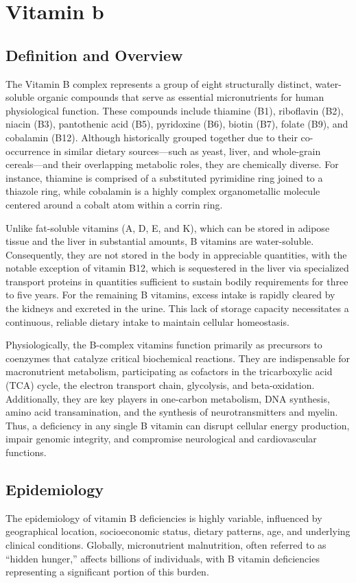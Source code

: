 \chapter{Vitamin b}

\section*{Definition and Overview}
The Vitamin B complex represents a group of eight structurally distinct, water-soluble organic compounds that serve as essential micronutrients for human physiological function. These compounds include thiamine (B1), riboflavin (B2), niacin (B3), pantothenic acid (B5), pyridoxine (B6), biotin (B7), folate (B9), and cobalamin (B12). Although historically grouped together due to their co-occurrence in similar dietary sources---such as yeast, liver, and whole-grain cereals---and their overlapping metabolic roles, they are chemically diverse. For instance, thiamine is comprised of a substituted pyrimidine ring joined to a thiazole ring, while cobalamin is a highly complex organometallic molecule centered around a cobalt atom within a corrin ring.

Unlike fat-soluble vitamins (A, D, E, and K), which can be stored in adipose tissue and the liver in substantial amounts, B vitamins are water-soluble. Consequently, they are not stored in the body in appreciable quantities, with the notable exception of vitamin B12, which is sequestered in the liver via specialized transport proteins in quantities sufficient to sustain bodily requirements for three to five years. For the remaining B vitamins, excess intake is rapidly cleared by the kidneys and excreted in the urine. This lack of storage capacity necessitates a continuous, reliable dietary intake to maintain cellular homeostasis.

Physiologically, the B-complex vitamins function primarily as precursors to coenzymes that catalyze critical biochemical reactions. They are indispensable for macronutrient metabolism, participating as cofactors in the tricarboxylic acid (TCA) cycle, the electron transport chain, glycolysis, and beta-oxidation. Additionally, they are key players in one-carbon metabolism, DNA synthesis, amino acid transamination, and the synthesis of neurotransmitters and myelin. Thus, a deficiency in any single B vitamin can disrupt cellular energy production, impair genomic integrity, and compromise neurological and cardiovascular functions.

\section*{Epidemiology}
The epidemiology of vitamin B deficiencies is highly variable, influenced by geographical location, socioeconomic status, dietary patterns, age, and underlying clinical conditions. Globally, micronutrient malnutrition, often referred to as ``hidden hunger,'' affects billions of individuals, with B vitamin deficiencies representing a significant portion of this burden.


